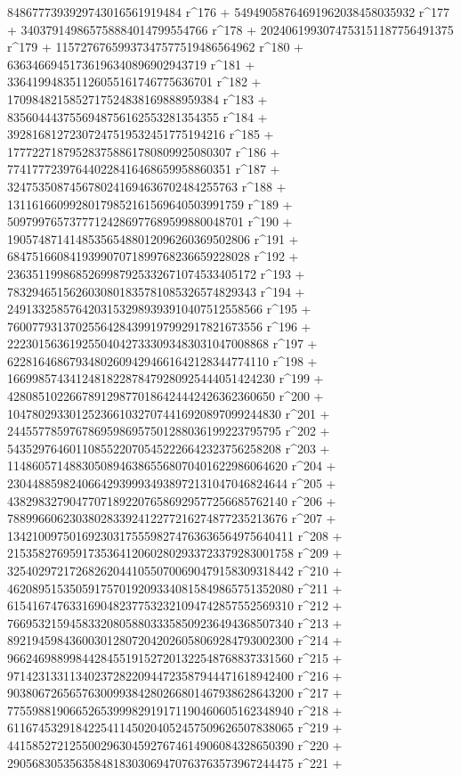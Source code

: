        8486777393929743016561919484 r^176 + 
       54949058764691962038458035932 r^177 + 
       340379149865758884014799554766 r^178 + 
       2024061993074753151187756491375 r^179 + 
       11572767659937347577519486564962 r^180 + 
       63634669451736196340896902943719 r^181 + 
       336419948351126055161746775636701 r^182 + 
       1709848215852717524838169888959384 r^183 + 
       8356044437556948756162553281354355 r^184 + 
       39281681272307247519532451775194216 r^185 + 
       177722718795283758861780809925080307 r^186 + 
       774177723976440228416468659958860351 r^187 + 
       3247535087456780241694636702484255763 r^188 + 
       13116166099280179852161569640503991759 r^189 + 
       50979976573777124286977689599880048701 r^190 + 
       190574871414853565488012096260369502806 r^191 + 
       684751660841939907071899768236659228028 r^192 + 
       2363511998685269987925332671074533405172 r^193 + 
       7832946515626030801835781085326574829343 r^194 + 
       24913325857642031532989393910407512558566 r^195 + 
       76007793137025564284399197992917821673556 r^196 + 
       222301563619255040427333093483031047008868 r^197 + 
       622816468679348026094294661642128344774110 r^198 + 
       1669985743412481822878479280925444051424230 r^199 + 
       4280851022667891298770186424442426362360650 r^200 + 
       10478029330125236610327074416920897099244830 r^201 + 
       24455778597678695986957501288036199223795795 r^202 + 
       54352976460110855220705452226642323756258208 r^203 + 
       114860571488305089463865568070401622986064620 r^204 + 
       230448859824066429399934938972131047046824644 r^205 + 
       438298327904770718922076586929577256685762140 r^206 + 
       788996606230380283392412277216274877235213676 r^207 + 
       1342100975016923031755598274763636564975640411 r^208 + 
       2153582769591735364120602802933723379283001758 r^209 + 
       3254029721726826204410550700690479158309318442 r^210 + 
       4620895153505917570192093340815849865751352080 r^211 + 
       6154167476331690482377532321094742857552569310 r^212 + 
       7669532159458332080588033358509236494368507340 r^213 + 
       8921945984360030128072042026058069284793002300 r^214 + 
       9662469889984428455191527201322548768837331560 r^215 + 
       9714231331134023728220944723587944471618942400 r^216 + 
       9038067265657630099384280266801467938628643200 r^217 + 
       7755988190665265399982919171190460605162348940 r^218 + 
       6116745329184225411450204052457509626507838065 r^219 + 
       4415852721255002963045927674614906084328650390 r^220 + 
       2905683053563584818303069470763763573967244475 r^221 + 
